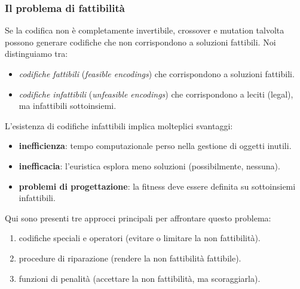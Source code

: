 \documentclass{article}
\begin{document}
\subsubsection{Il problema di fattibilità}
Se la codifica non è completamente invertibile, crossover e mutation talvolta possono generare
codifiche che non corrispondono a soluzioni fattibili.
Noi distinguiamo tra:
\begin{itemize}
    \item \textit{codifiche fattibili} (\textit{feasible encodings}) che corrispondono a soluzioni fattibili.
    \item \textit{codifiche infattibili} (\textit{unfeasible encodings}) che corrispondono
    a leciti (legal), ma infattibili sottoinsiemi.
\end{itemize}
L'esistenza di codifiche infattibili implica molteplici svantaggi:
\begin{itemize}
    \item \textbf{inefficienza}: tempo computazionale perso nella gestione di oggetti inutili.
    \item \textbf{inefficacia}: l'euristica esplora meno soluzioni (possibilmente, nessuna).
    \item \textbf{problemi di progettazione}: la fitness deve essere definita su sottoinsiemi infattibili.
\end{itemize}
Qui sono presenti tre approcci principali per affrontare questo problema:
\begin{enumerate}
    \item codifiche speciali e operatori (evitare o limitare la non fattibilità).
    \item procedure di riparazione (rendere la non fattibilità fattibile).
    \item funzioni di penalità (accettare la non fattibilità, ma scoraggiarla).
\end{enumerate}
\end{document}
